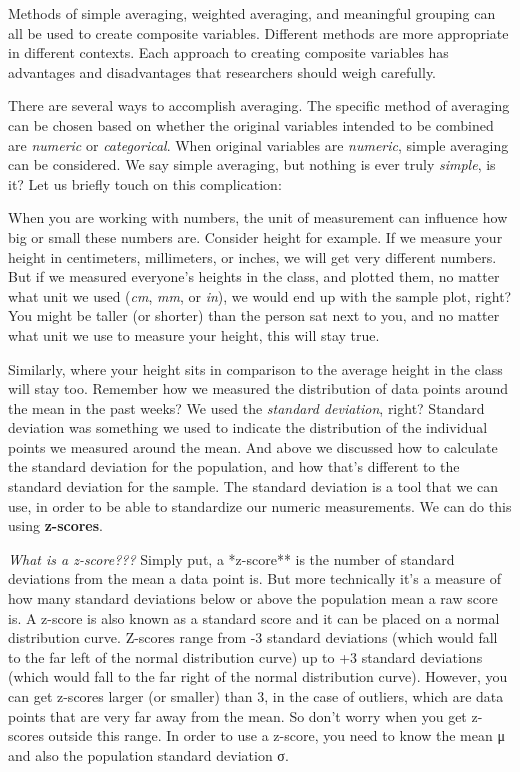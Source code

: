 \documentclass[
]{book}
\begin{document}
Methods of simple averaging, weighted averaging, and meaningful grouping can all be used to create composite variables. Different methods are more appropriate in different contexts. Each approach to creating composite variables has advantages and disadvantages that researchers should weigh carefully.

There are several ways to accomplish averaging. The specific method of averaging can be chosen based on whether the original variables intended to be combined are \emph{numeric} or \emph{categorical}. When original variables are \emph{numeric}, simple averaging can be considered. We say simple averaging, but nothing is ever truly \emph{simple}, is it? Let us briefly touch on this complication:

When you are working with numbers, the unit of measurement can influence how big or small these numbers are. Consider height for example. If we measure your height in centimeters, millimeters, or inches, we will get very different numbers. But if we measured everyone's heights in the class, and plotted them, no matter what unit we used (\emph{cm}, \emph{mm}, or \emph{in}), we would end up with the sample plot, right? You might be taller (or shorter) than the person sat next to you, and no matter what unit we use to measure your height, this will stay true.

Similarly, where your height sits in comparison to the average height in the class will stay too. Remember how we measured the distribution of data points around the mean in the past weeks? We used the \emph{standard deviation}, right? Standard deviation was something we used to indicate the distribution of the individual points we measured around the mean. And above we discussed how to calculate the standard deviation for the population, and how that's different to the standard deviation for the sample. The standard deviation is a tool that we can use, in order to be able to standardize our numeric measurements. We can do this using \textbf{z-scores}.

\emph{What is a z-score???} Simply put, a *z-score** is the number of standard deviations from the mean a data point is. But more technically it's a measure of how many standard deviations below or above the population mean a raw score is. A z-score is also known as a standard score and it can be placed on a normal distribution curve. Z-scores range from -3 standard deviations (which would fall to the far left of the normal distribution curve) up to +3 standard deviations (which would fall to the far right of the normal distribution curve). However, you can get z-scores larger (or smaller) than 3, in the case of outliers, which are data points that are very far away from the mean. So don't worry when you get z-scores outside this range. In order to use a z-score, you need to know the mean μ and also the population standard deviation σ.
\end{document}
